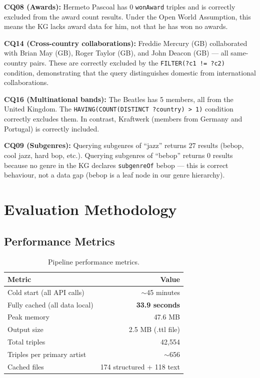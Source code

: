 \documentclass[11pt,a4paper]{article}
\begin{document}
\textbf{CQ08 (Awards):} Hermeto Pascoal has 0 \texttt{wonAward} triples and is correctly excluded from the award count results. Under the Open World Assumption, this means the KG lacks award data for him, not that he has won no awards.

\textbf{CQ14 (Cross-country collaborations):} Freddie Mercury (GB) collaborated with Brian May (GB), Roger Taylor (GB), and John Deacon (GB) --- all same-country pairs. These are correctly excluded by the \texttt{FILTER(?c1 != ?c2)} condition, demonstrating that the query distinguishes domestic from international collaborations.

\textbf{CQ16 (Multinational bands):} The Beatles has 5 members, all from the United Kingdom. The \texttt{HAVING(COUNT(DISTINCT ?country) > 1)} condition correctly excludes them. In contrast, Kraftwerk (members from Germany and Portugal) is correctly included.

\textbf{CQ09 (Subgenres):} Querying subgenres of ``jazz'' returns 27 results (bebop, cool jazz, hard bop, etc.). Querying subgenres of ``bebop'' returns 0 results because no genre in the KG declares \texttt{subgenreOf} bebop --- this is correct behaviour, not a data gap (bebop is a leaf node in our genre hierarchy).

\section{Evaluation Methodology}

\subsection{Performance Metrics}

\begin{table}[h]
\centering
\begin{tabular}{lr}
\toprule
\textbf{Metric} & \textbf{Value} \\
\midrule
Cold start (all API calls) & $\sim$45 minutes \\
Fully cached (all data local) & \textbf{33.9 seconds} \\
Peak memory & 47.6 MB \\
Output size & 2.5 MB (.ttl file) \\
Total triples & 42,554 \\
Triples per primary artist & $\sim$656 \\
Cached files & 174 structured + 118 text \\
\bottomrule
\end{tabular}
\caption{Pipeline performance metrics.}
\end{table}
\end{document}
